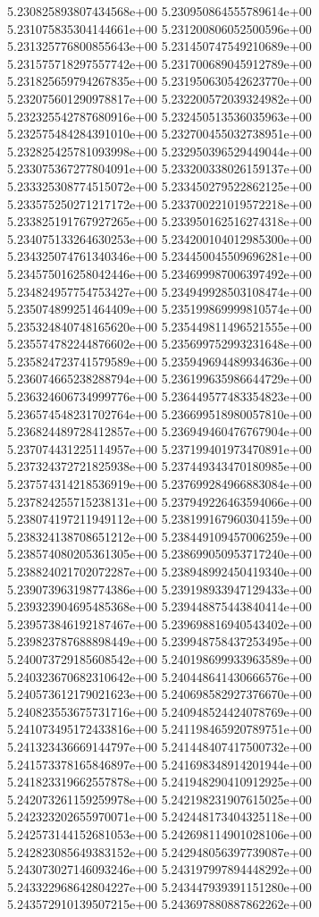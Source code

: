 5.230825893807434568e+00
5.230950864555789614e+00
5.231075835304144661e+00
5.231200806052500596e+00
5.231325776800855643e+00
5.231450747549210689e+00
5.231575718297557742e+00
5.231700689045912789e+00
5.231825659794267835e+00
5.231950630542623770e+00
5.232075601290978817e+00
5.232200572039324982e+00
5.232325542787680916e+00
5.232450513536035963e+00
5.232575484284391010e+00
5.232700455032738951e+00
5.232825425781093998e+00
5.232950396529449044e+00
5.233075367277804091e+00
5.233200338026159137e+00
5.233325308774515072e+00
5.233450279522862125e+00
5.233575250271217172e+00
5.233700221019572218e+00
5.233825191767927265e+00
5.233950162516274318e+00
5.234075133264630253e+00
5.234200104012985300e+00
5.234325074761340346e+00
5.234450045509696281e+00
5.234575016258042446e+00
5.234699987006397492e+00
5.234824957754753427e+00
5.234949928503108474e+00
5.235074899251464409e+00
5.235199869999810574e+00
5.235324840748165620e+00
5.235449811496521555e+00
5.235574782244876602e+00
5.235699752993231648e+00
5.235824723741579589e+00
5.235949694489934636e+00
5.236074665238288794e+00
5.236199635986644729e+00
5.236324606734999776e+00
5.236449577483354823e+00
5.236574548231702764e+00
5.236699518980057810e+00
5.236824489728412857e+00
5.236949460476767904e+00
5.237074431225114957e+00
5.237199401973470891e+00
5.237324372721825938e+00
5.237449343470180985e+00
5.237574314218536919e+00
5.237699284966883084e+00
5.237824255715238131e+00
5.237949226463594066e+00
5.238074197211949112e+00
5.238199167960304159e+00
5.238324138708651212e+00
5.238449109457006259e+00
5.238574080205361305e+00
5.238699050953717240e+00
5.238824021702072287e+00
5.238948992450419340e+00
5.239073963198774386e+00
5.239198933947129433e+00
5.239323904695485368e+00
5.239448875443840414e+00
5.239573846192187467e+00
5.239698816940543402e+00
5.239823787688898449e+00
5.239948758437253495e+00
5.240073729185608542e+00
5.240198699933963589e+00
5.240323670682310642e+00
5.240448641430666576e+00
5.240573612179021623e+00
5.240698582927376670e+00
5.240823553675731716e+00
5.240948524424078769e+00
5.241073495172433816e+00
5.241198465920789751e+00
5.241323436669144797e+00
5.241448407417500732e+00
5.241573378165846897e+00
5.241698348914201944e+00
5.241823319662557878e+00
5.241948290410912925e+00
5.242073261159259978e+00
5.242198231907615025e+00
5.242323202655970071e+00
5.242448173404325118e+00
5.242573144152681053e+00
5.242698114901028106e+00
5.242823085649383152e+00
5.242948056397739087e+00
5.243073027146093246e+00
5.243197997894448292e+00
5.243322968642804227e+00
5.243447939391151280e+00
5.243572910139507215e+00
5.243697880887862262e+00
